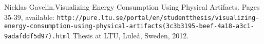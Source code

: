 
	\begin{thebibliography}{50}
			
			 Nicklas Gavelin.Visualizing Energy Consumption Using Physical Artifacts.  Pages 35-39, available: \texttt{http://pure.ltu.se/portal/en/studentthesis/visualizing-energy-consumption-using-physical-artifacts(3c3b3195-beef-4a18-a3c1-9adafddf5d97).html} Thesis at LTU, Luleå, Sweden, 2012.
	
	
	\end{thebibliography}
